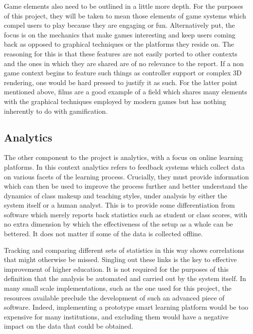 \documentclass[12pt]{article}
\begin{document}
Game elements also need to be outlined in a little more depth. For the purposes of this project, they will be taken to mean those elements of game systems which compel users to play because they are engaging or fun. Alternatively put, the focus is on the mechanics that make games interesting and keep users coming back as opposed to graphical techniques or the platforms they reside on. The reasoning for this is that these features are not easily ported to other contexts and the ones in which they are shared are of no relevance to the report. If a non game context begins to feature such things as controller support or complex 3D rendering, one would be hard pressed to justify it as such. For the latter point mentioned above, films are a good example of a field which shares many elements with the graphical techniques employed by modern games but has nothing inherently to do with gamification.

\subsection{Analytics}
The other component to the project is analytics, with a focus on online learning platforms. In this context analytics refers to feedback systems which collect data on various facets of the learning process. Crucially, they must provide information which can then be used to improve the process further and better understand the dynamics of class makeup and teaching styles, under analysis by either the system itself or a human analyst. This is to provide some differentiation from software which merely reports back statistics such as student or class scores, with no extra dimension by which the effectiveness of the setup as a whole can be bettered. It does not matter if some of the data is collected offline.

Tracking and comparing different sets of statistics in this way shows correlations that might otherwise be missed. Singling out these links is the key to effective improvement of higher education. It is not required for the purposes of this definition that the analysis be automated and carried out by the system itself. In many small scale implementations, such as the one used for this project, the resources available preclude the development of such an advanced piece of software. Indeed, implementing a prototype smart learning platform would be too expensive for many institutions, and excluding them would have a negative impact on the data that could be obtained.
\end{document}
